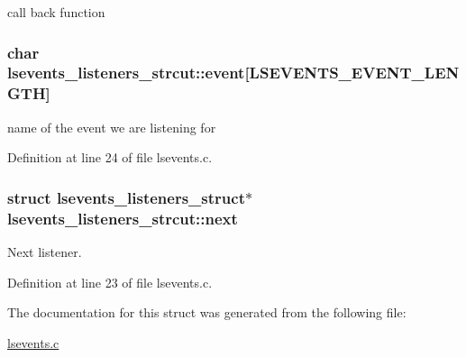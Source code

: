 call back function \hypertarget{structlsevents__listeners__strcut_a117a2d78868c4f192604d7f522884602}{
\subsubsection[{event}]{\setlength{\rightskip}{0pt plus 5cm}char {\bf lsevents\_\-listeners\_\-strcut::event}\mbox{[}LSEVENTS\_\-EVENT\_\-LENGTH\mbox{]}}}
\label{structlsevents__listeners__strcut_a117a2d78868c4f192604d7f522884602}


name of the event we are listening for 

Definition at line 24 of file lsevents.c.\hypertarget{structlsevents__listeners__strcut_a4e76c0111d52fb0143460176874baa31}{
\subsubsection[{next}]{\setlength{\rightskip}{0pt plus 5cm}struct lsevents\_\-listeners\_\-struct$\ast$ {\bf lsevents\_\-listeners\_\-strcut::next}}}
\label{structlsevents__listeners__strcut_a4e76c0111d52fb0143460176874baa31}


Next listener. 

Definition at line 23 of file lsevents.c.

The documentation for this struct was generated from the following file:\begin{DoxyCompactItemize}
\item 
\hyperlink{lsevents_8c}{lsevents.c}\end{DoxyCompactItemize}
